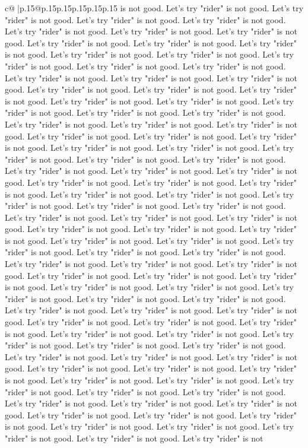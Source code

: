 \documentclass{article}
\begin{document}
{\begin{supertabular}{c@{$\;$}|p{.15\linewidth}@{}p{.15\linewidth}p{.15\linewidth}p{.15\linewidth}p{.15\linewidth}p{.15\linewidth}}
{{{is not good. Let's try "rider" is not good. Let's try "rider" is not good. Let's try "rider" is not good. Let's try "rider" is not good. Let's try "rider" is not good. Let's try "rider" is not good. Let's try "rider" is not good. Let's try "rider" is not good. Let's try "rider" is not good. Let's try "rider" is not good. Let's try "rider" is not good. Let's try "rider" is not good. Let's try "rider" is not good. Let's try "rider" is not good. Let's try "rider" is not good. Let's try "rider" is not good. Let's try "rider" is not good. Let's try "rider" is not good. Let's try "rider" is not good. Let's try "rider" is not good. Let's try "rider" is not good. Let's try "rider" is not good. Let's try "rider" is not good. Let's try "rider" is not good. Let's try "rider" is not good. Let's try "rider" is not good. Let's try "rider" is not good. Let's try "rider" is not good. Let's try "rider" is not good. Let's try "rider" is not good. Let's try "rider" is not good. Let's try "rider" is not good. Let's try "rider" is not good. Let's try "rider" is not good. Let's try "rider" is not good. Let's try "rider" is not good. Let's try "rider" is not good. Let's try "rider" is not good. Let's try "rider" is not good. Let's try "rider" is not good. Let's try "rider" is not good. Let's try "rider" is not good. Let's try "rider" is not good. Let's try "rider" is not good. Let's try "rider" is not good. Let's try "rider" is not good. Let's try "rider" is not good. Let's try "rider" is not good. Let's try "rider" is not good. Let's try "rider" is not good. Let's try "rider" is not good. Let's try "rider" is not good. Let's try "rider" is not good. Let's try "rider" is not good. Let's try "rider" is not good. Let's try "rider" is not good. Let's try "rider" is not good. Let's try "rider" is not good. Let's try "rider" is not good. Let's try "rider" is not good. Let's try "rider" is not good. Let's try "rider" is not good. Let's try "rider" is not good. Let's try "rider" is not good. Let's try "rider" is not good. Let's try "rider" is not good. Let's try "rider" is not good. Let's try "rider" is not good. Let's try "rider" is not good. Let's try "rider" is not good. Let's try "rider" is not good. Let's try "rider" is not good. Let's try "rider" is not good. Let's try "rider" is not good. Let's try "rider" is not good. Let's try "rider" is not good. Let's try "rider" is not good. Let's try "rider" is not good. Let's try "rider" is not good. Let's try "rider" is not good. Let's try "rider" is not good. Let's try "rider" is not good. Let's try "rider" is not good. Let's try "rider" is not good. Let's try "rider" is not good. Let's try "rider" is not good. Let's try "rider" is not good. Let's try "rider" is not good. Let's try "rider" is not good. Let's try "rider" is not good. Let's try "rider" is not good. Let's try "rider" is not good. Let's try "rider" is not good. Let's try "rider" is not good. Let's try "rider" is not good. Let's try "rider" is not good. Let's try "rider" is not good. Let's try "rider" is not good. Let's try "rider" is not good. Let's try "rider" is not good. Let's try "rider" is not good. Let's try "rider" is not good. Let's try "rider" is not }}}
\end{supertabular}}
\end{document}
